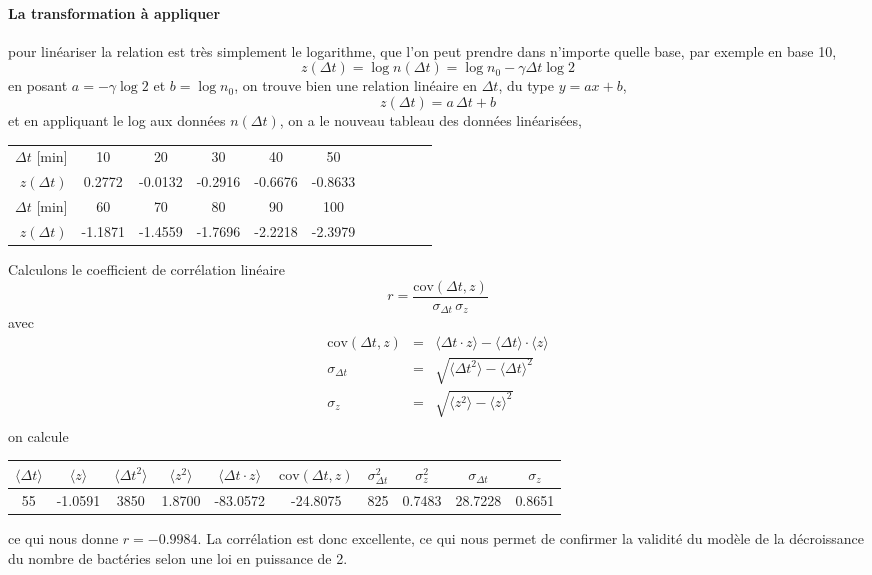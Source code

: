 \paragraph{La transformation à appliquer} pour linéariser la relation est très simplement le logarithme, que l'on peut prendre dans n'importe quelle base, par exemple en base 10,
$$
z(\Delta t)=\log{n(\Delta t)}=\log{n_0}-\gamma\Delta t\log{2}
$$
en posant $a=-\gamma\log{2}$ et $b=\log{n_0}$, on trouve bien une relation linéaire en $\Delta t$, du type $y=ax+b$,
$$
z(\Delta t)=a\,\Delta t+b
$$
et en appliquant le log aux données $n(\Delta t)$, on a le nouveau tableau des données linéarisées,
\begin{center}
\begin{tabular}{r|cccccccccc}
$\Delta t$ [min] & 10 & 20 & 30 & 40 & 50 \\
$z(\Delta t)$ & 0.2772 & -0.0132 & -0.2916 & -0.6676 & -0.8633 \\\hline\hline
$\Delta t$ [min] & 60 & 70 & 80 & 90 & 100\\
$z(\Delta t)$ & -1.1871 & -1.4559 & -1.7696 & -2.2218 & -2.3979
\end{tabular}
\end{center}
Calculons le coefficient de corrélation linéaire
$$
r=\frac{\text{cov}(\Delta t,z)}{\sigma_{\Delta t}\,\sigma_z}
$$
avec
\begin{eqnarray*}
\text{cov}(\Delta t,z)&=&
\langle\Delta t\cdot z\rangle-\langle\Delta t\rangle\cdot\langle z\rangle\\
\sigma_{\Delta t}&=&\sqrt{\langle\Delta t^2\rangle-\langle\Delta t\rangle^2}\\
\sigma_{z}&=&\sqrt{\langle z^2\rangle-\langle z\rangle^2}\\
\end{eqnarray*}
on calcule
\begin{center}
\begin{tabular}{ccccc|ccccc}
$\langle\Delta t\rangle$ &
$\langle z\rangle$ &
$\langle\Delta t^2\rangle$ &
$\langle z^2\rangle$ &
$\langle\Delta t\cdot z\rangle$ &
$\text{cov}(\Delta t,z)$ &
$\sigma_{\Delta t}^2$ &
$\sigma_{z}^2$ &
$\sigma_{\Delta t}$ &
$\sigma_{z}$
\\\hline
55 & -1.0591 & 3850 & 1.8700 & -83.0572 & -24.8075 & 825 & 0.7483 & 28.7228 & 0.8651
\end{tabular}
\end{center}
ce qui nous donne $r=-0.9984$. La corrélation est donc excellente, ce qui nous permet de confirmer la validité du modèle de la décroissance du nombre de bactéries selon une loi en puissance de 2.

